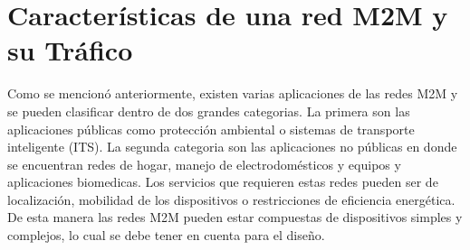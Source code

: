 \documentclass[journal]{IEEEtran}
\begin{document}
%



\section{Características de una red M2M y su Tráfico}
Como se mencion\'o anteriormente, existen varias aplicaciones de las redes M2M y se pueden clasificar dentro de dos grandes categorias. La primera son las aplicaciones p\'ublicas como protecci\'on ambiental o sistemas de transporte inteligente (ITS). La segunda categoria son las aplicaciones no p\'ublicas en donde se encuentran redes de hogar, manejo de electrodom\'esticos y equipos y aplicaciones biomedicas. Los servicios que requieren estas redes pueden ser de localizaci\'on, mobilidad de los dispositivos o restricciones de eficiencia energ\'etica. De esta manera las redes M2M pueden estar compuestas de dispositivos simples y complejos, lo cual se debe tener en cuenta para el diseño.\\
\end{document}

